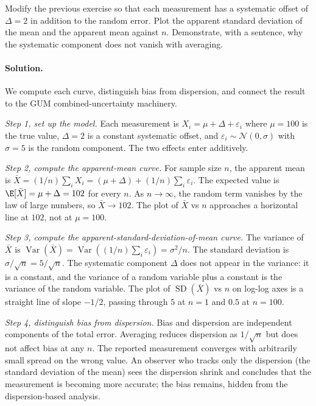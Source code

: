 \begin{exercise}
Modify the previous exercise so that each measurement has a
systematic offset of $\Delta = 2$ in addition to the random error.
Plot the apparent standard deviation of the mean and the apparent
mean against $n$. Demonstrate, with a sentence, why the systematic
component does not vanish with averaging.

\paragraph{Solution.}
We compute each curve, distinguish bias from dispersion, and connect
the result to the GUM combined-uncertainty machinery.

\textit{Step 1, set up the model.} Each measurement is
$X_{i} = \mu + \Delta + \varepsilon_{i}$ where $\mu = 100$ is the
true value, $\Delta = 2$ is a constant systematic offset, and
$\varepsilon_{i} \sim \mathcal{N}(0, \sigma)$ with $\sigma = 5$ is
the random component. The two effects enter additively.

\textit{Step 2, compute the apparent-mean curve.} For sample size
$n$, the apparent mean is
$\bar{X} = (1/n) \sum_{i} X_{i} = (\mu + \Delta) + (1/n)\sum_{i}
\varepsilon_{i}$.
The expected value is $\E[\bar{X}] = \mu + \Delta = 102$ for every
$n$. As $n \to \infty$, the random term vanishes by the law of
large numbers, so $\bar{X} \to 102$. The plot of $\bar{X}$ vs $n$
approaches a horizontal line at $102$, not at $\mu = 100$.

\textit{Step 3, compute the apparent-standard-deviation-of-mean
curve.} The variance of $\bar{X}$ is
$\operatorname{Var}(\bar{X}) = \operatorname{Var}((1/n)\sum_{i}
\varepsilon_{i}) = \sigma^{2}/n$. The standard deviation is
$\sigma/\sqrt{n} = 5/\sqrt{n}$. The systematic component $\Delta$
does not appear in the variance: it is a constant, and the variance
of a random variable plus a constant is the variance of the random
variable. The plot of $\operatorname{SD}(\bar{X})$ vs $n$ on
log-log axes is a straight line of slope $-1/2$, passing through
$5$ at $n = 1$ and $0.5$ at $n = 100$.

\textit{Step 4, distinguish bias from dispersion.} Bias and
dispersion are independent components of the total error. Averaging
reduces dispersion as $1/\sqrt{n}$ but does not affect bias at any
$n$. The reported measurement converges with arbitrarily small
spread on the wrong value. An observer who tracks only the
dispersion (the standard deviation of the mean) sees the dispersion
shrink and concludes that the measurement is becoming more
accurate; the bias remains, hidden from the dispersion-based
analysis.


\end{exercise}

